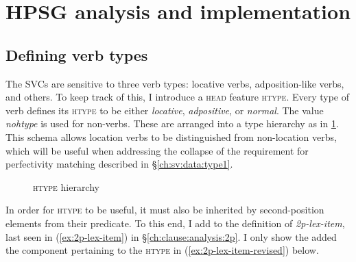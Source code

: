 \section{HPSG analysis and implementation} \label{ch:sv:analysis}

\subsection{Defining verb types} \label{ch:sv:analysis:htype}

The SVCs are sensitive to three verb types: locative verbs, adposition-like verbs, and others. To keep track of this, I introduce a \textsc{head} feature \textsc{htype}. Every type of verb defines its \textsc{htype} to be either \textit{locative}, \textit{adpositive}, or \textit{normal}. The value \textit{nohtype} is used for non-verbs. These are arranged into a type hierarchy as in \cref{figure:htypehierarchy}. This schema allows location verbs to be distinguished from non-location verbs, which will be useful when addressing the collapse of the requirement for perfectivity matching described in \S\ref{ch:sv:data:type1}.

\begin{figure}[H]
\begin{center}
\caption{\textsc{htype} hierarchy}
\label{figure:htypehierarchy}
\end{center}
\end{figure}

In order for \textsc{htype} to be useful, it must also be inherited by second-position elements from their predicate. To this end, I add to the definition of {\textit{2p-lex-item}}, last seen in (\ref{ex:2p-lex-item}) in \S\ref{ch:clause:analysis:2p}. I only show the added the component pertaining to the \textsc{htype} in (\ref{ex:2p-lex-item-revised}) below.


